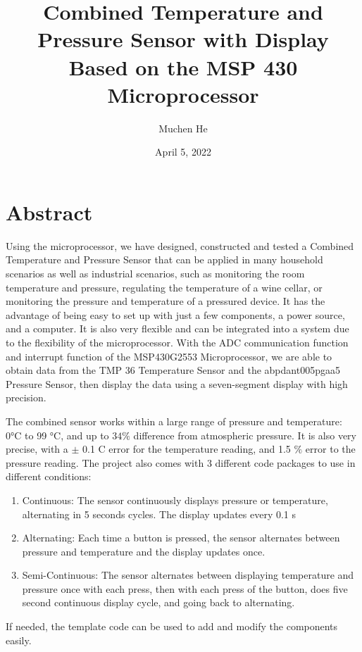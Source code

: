 \documentclass{article}
\begin{document}
\title{Combined Temperature and Pressure Sensor with Display Based on the MSP 430 Microprocessor}
\author{Muchen He}
\date{April 5, 2022}
\maketitle

\section{Abstract}
Using the microprocessor, we have designed, constructed and tested a Combined Temperature and Pressure Sensor that can be applied in many household scenarios as well as industrial scenarios, such as monitoring the room temperature and pressure, regulating the temperature of a wine cellar, or monitoring the pressure and temperature of a pressured device. It has the advantage of being easy to set up with just a few  components, a power source, and a computer. It is also very flexible and can be integrated into a system due to the flexibility of the microprocessor. With the ADC communication function and interrupt function of the MSP430G2553 Microprocessor, we are able to obtain data from the TMP 36 Temperature Sensor and the abpdant005pgaa5 Pressure Sensor, then display the data using a seven-segment display with high precision. 

The combined sensor works within a large range of pressure and temperature: 0°C  to 99 °C, and up to $34\%$ difference from atmospheric pressure. It is also very precise, with a $\pm$ 0.1 \textdegree C error for the temperature reading, and 1.5 $\%$ error to the pressure reading. The project also comes with 3 different code packages to use in different conditions:

\begin{enumerate}
    \item Continuous:  The sensor continuously displays pressure or temperature, alternating in 5 seconds cycles.  The display updates every 0.1 s
    \item Alternating:  Each time a button is pressed, the sensor alternates between pressure and temperature and the display updates once. 
    \item Semi-Continuous: The sensor alternates between displaying temperature and pressure once with each press, then with each press of the button, does five second continuous display cycle, and going back to alternating. 
\end{enumerate}
If needed, the template code can be used to add and modify the components easily.
\end{document}
